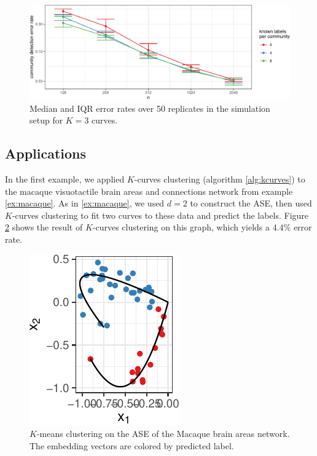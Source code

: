 \documentclass[
  12pt,
]{article}
\theoremstyle{definition}
\theoremstyle{definition}
\theoremstyle{definition}
\theoremstyle{definition}
\theoremstyle{remark}
\begin{document}
\begin{figure}[H]

{\centering \includegraphics{draft_files/figure-latex/sim-curves-3-1} 

}

\caption{Median and IQR error rates over 50 replicates in the simulation setup for $K = 3$ curves.}\label{fig:sim-curves-3}
\end{figure}

\hypertarget{applications-1}{%
\subsection{Applications}\label{applications-1}}

In the first example, we applied \(K\)-curves clustering (algorithm \ref{alg:kcurves}) to the macaque visuotactile brain areas and connections network from example \ref{ex:macaque}.
As in \ref{ex:macaque}, we used \(d = 2\) to construct the ASE, then used \(K\)-curves clustering to fit two curves to these data and predict the labels.
Figure \ref{fig:macaque-fitted} shows the result of \(K\)-curves clustering on this graph,
which yields a 4.4\% error rate.

\begin{figure}[H]

{\centering \includegraphics{draft_files/figure-latex/macaque-fitted-1} 

}

\caption{$K$-means clustering on the ASE of the Macaque brain areas network. The embedding vectors are colored by predicted label.}\label{fig:macaque-fitted}
\end{figure}
\end{document}
